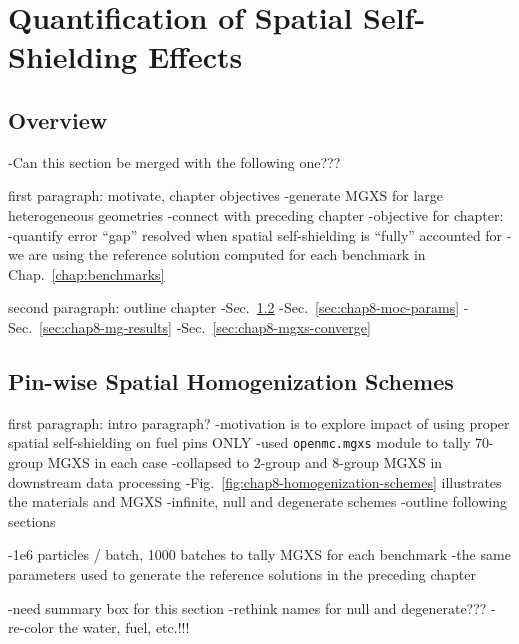 \chapter{Quantification of Spatial Self-Shielding Effects}
\label{chap:quantify}


\section{Overview}
\label{sec:chap8-overview}

-Can this section be merged with the following one???

first paragraph: motivate, chapter objectives
-generate MGXS for large heterogeneous geometries
-connect with preceding chapter
-objective for chapter:
  -quantify error ``gap'' resolved when spatial self-shielding is ``fully'' accounted for
  -we are using the reference solution computed for each benchmark in Chap.~\ref{chap:benchmarks}

second paragraph: outline chapter
-Sec.~\ref{sec:chap8-pinwise-space-homogenize}
-Sec.~\ref{sec:chap8-moc-params}
-Sec.~\ref{sec:chap8-mg-results}
-Sec.~\ref{sec:chap8-mgxs-converge}


\section{Pin-wise Spatial Homogenization Schemes}
\label{sec:chap8-pinwise-space-homogenize}

first paragraph: intro paragraph?
-motivation is to explore impact of using proper spatial self-shielding on fuel pins ONLY
-used \texttt{openmc.mgxs} module to tally 70-group \ac{MGXS} in each case
  -collapsed to 2-group and 8-group \ac{MGXS} in downstream data processing
-Fig.~\ref{fig:chap8-homogenization-schemes} illustrates the materials and \ac{MGXS}
  -infinite, null and degenerate schemes
-outline following sections

-1e6 particles / batch, 1000 batches to tally \ac{MGXS} for each benchmark
  -the same parameters used to generate the reference solutions in the preceding chapter

-need summary box for this section
-rethink names for null and degenerate???
-re-color the water, fuel, etc.!!!

